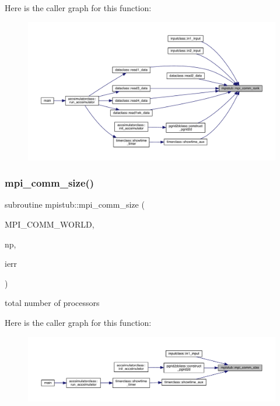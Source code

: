 Here is the caller graph for this function\+:\nopagebreak
\begin{figure}[H]
\begin{center}
\leavevmode
\includegraphics[width=350pt]{namespacempistub_a3085e38e0e5d38df633afc7b2d92cebb_icgraph}
\end{center}
\end{figure}
\mbox{\label{namespacempistub_a188b67a76569dcb918a27f48018e6baf}} 
\subsubsection{\texorpdfstring{mpi\_comm\_size()}{mpi\_comm\_size()}}
{\footnotesize\ttfamily subroutine mpistub\+::mpi\+\_\+comm\+\_\+size (\begin{DoxyParamCaption}\item[{}]{M\+P\+I\+\_\+\+C\+O\+M\+M\+\_\+\+W\+O\+R\+LD,  }\item[{}]{np,  }\item[{}]{ierr }\end{DoxyParamCaption})}



total number of processors 

Here is the caller graph for this function\+:\nopagebreak
\begin{figure}[H]
\begin{center}
\leavevmode
\includegraphics[width=350pt]{namespacempistub_a188b67a76569dcb918a27f48018e6baf_icgraph}
\end{center}
\end{figure}
\mbox{\label{namespacempistub_a6a6bc8ca0a832b3f53660407ed51302d}} 
